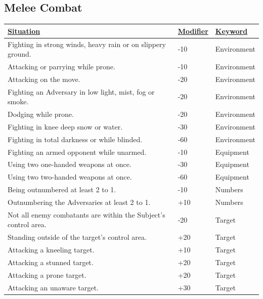 \subsection{Melee Combat}
\begin{tabularx}{\textwidth}{|X|l|l|}
	\hline
	\ul{Situation} & \ul{Modifier} & \ul{Keyword} \\ \hline
	Fighting in strong winds, heavy rain or on slippery ground. & -10 & Environment \\ \hline
	Attacking or parrying while prone. & -10 & Environment \\ \hline
	Attacking on the move. & -20 & Environment \\ \hline
	Fighting an Adversary in low light, mist, fog or smoke. & -20 & Environment \\ \hline
	Dodging while prone. & -20 & Environment \\ \hline
	Fighting in knee deep snow or water. & -30 & Environment \\ \hline
	Fighting in total darkness or while blinded. & -60 & Environment \\ \hline
	Fighting an armed opponent while unarmed. & -10 & Equipment \\ \hline
	Using two one-handed weapons at once. & -30 & Equipment \\ \hline
	Using two two-handed weapons at once. & -60 & Equipment \\ \hline
	Being outnumbered at least 2 to 1. & -10 & Numbers \\ \hline
	Outnumbering the Adversaries at least 2 to 1. & +10 & Numbers \\ \hline
	Not all enemy combatants are within the Subject's control area. & -20 & Target \\ \hline
	Standing outside of the target's control area. & +20 & Target \\ \hline
	Attacking a kneeling target. & +10 & Target \\ \hline
	Attacking a stunned target. & +20 & Target \\ \hline
	Attacking a prone target. & +20 & Target \\ \hline
	Attacking an unaware target. & +30 & Target \\ \hline
\end{tabularx}

